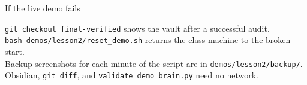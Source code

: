 \begin{frame}{If the live demo fails}
  {\small
  \texttt{git checkout final-verified} shows the vault after a successful audit.\\[0.4em]
  \texttt{bash demos/lesson2/reset\_demo.sh} returns the class machine to the broken start.\\[0.4em]
  Backup screenshots for each minute of the script are in \texttt{demos/lesson2/backup/}.\\[0.4em]
  Obsidian, \texttt{git diff}, and \texttt{validate\_demo\_brain.py} need no network.\par}
\end{frame}
